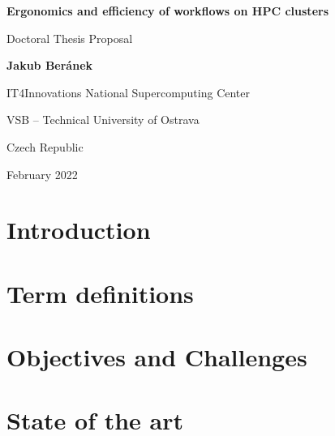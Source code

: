\documentclass[11pt]{article}
\begin{document}
\begin{titlepage}
    \begin{center}
        \vspace*{1cm}
        \par
        \Huge
        \textbf{Ergonomics and efficiency of workflows on HPC clusters}
        \par
        \vspace{0.5cm}
        \LARGE
        Doctoral Thesis Proposal
        \par
        \vspace{1.5cm}
        \par
        \textbf{Jakub Beránek}
        \par
        \vspace{6cm}
        \par
        {
            \Large
            IT4Innovations National Supercomputing Center\par
            VSB -- Technical University of Ostrava\par
            Czech Republic\par
            February 2022
        }
    \end{center}

    \vspace{1.5cm}
\end{titlepage}

\tableofcontents
\clearpage

\section{Introduction}
\label{sec:introduction}


\section{Term definitions}
\label{sec:task_graph_definition}


\section{Objectives and Challenges}
\label{sec:challenges}


\section{State of the art}
\label{sec:state_of_the_art}

\end{document}
